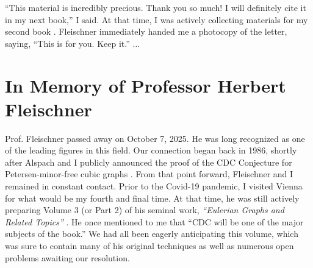\documentclass[11pt]{article}
\begin{document}
      ``This material is incredibly precious. Thank you so much! I will definitely cite it in my next book,''
      I said. At that time, I was actively collecting materials for my second book \cite{ZhangBook2}. Fleischner immediately handed me a photocopy of the letter, saying, ``This is for you. Keep it.'' \(\dots \)



      \section{In Memory of Professor Herbert Fleischner}
      Prof. Fleischner passed away on October 7, 2025. He was long recognized as one of the leading figures in this field.
      Our connection began back in 1986, shortly after Alspach and I publicly announced the proof of the CDC Conjecture for Petersen-minor-free cubic graphs \cite{Alspach1993}.
      From that point forward, Fleischner and I remained in constant contact.
      Prior to the Covid-19 pandemic, I visited Vienna for what would be my fourth and final time.
      At that time, he was still actively preparing Volume 3 (or Part 2) of his seminal work, {\em ``Eulerian Graphs and Related Topics''} \cite{Fleischner1990, Fleischner1991}.
      He once mentioned to me that
      ``CDC will be one of the major subjects of the book.''
      We had all been eagerly anticipating this volume, which was sure to contain many of his original techniques as well as numerous open problems awaiting our resolution.
\end{document}
